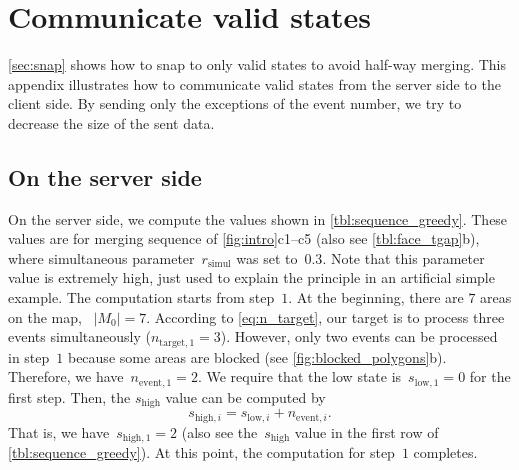\documentclass[twocolumn]{svjour3}          %
\begin{document}
\bigskip


\section{Communicate valid states}
\label{appx:communicate_valid_states}

\sect\ref{sec:snap} shows how to snap to only valid states 
to avoid half-way merging.
This appendix illustrates how to communicate valid states 
from the server side to the client side.
By sending only the exceptions of the event number, 
we try to decrease the size of the sent data.



\subsection{On the server side}
\label{sec:communicate_server}

On the server side, 
we compute the values shown in \tabl\ref{tbl:sequence_greedy}.
These values are for merging sequence of \figs\ref{fig:intro}c1--c5
(also see \tabl\ref{tbl:face_tgap}b),
where simultaneous parameter~$r_\mathrm{simul}$ was set to~$0.3$.
Note that this parameter value is extremely high, 
just used to explain the principle in an artificial simple example.
The computation starts from step~$1$.
At the beginning, there are $7$ areas on the map, \ie~$|M_0| = 7$.
According to \eq\ref{eq:n_target},
our target is to process three events simultaneously 
($n_{\mathrm{target},1} = 3$).
However, only two events can be processed in step~$1$ 
because some areas are blocked
(see \fig\ref{fig:blocked_polygons}b).
Therefore, we have~$n_{\mathrm{event},1} = 2$.
We require that the low state is~$s_{\mathrm{low},1} = 0$ for the first step.
Then, the $s_\mathrm{high}$ value can be computed by
\begin{equation}
\label{eq:state_high}
s_{\mathrm{high},i} = s_{\mathrm{low},i} + n_{\mathrm{event},i}.
\end{equation}
That is, we have~$s_{\mathrm{high},1}=2$
(also see the~$s_\mathrm{high}$ value 
in the first row of \tabl\ref{tbl:sequence_greedy}).
At this point, the computation for step~$1$ completes.
\end{document}

